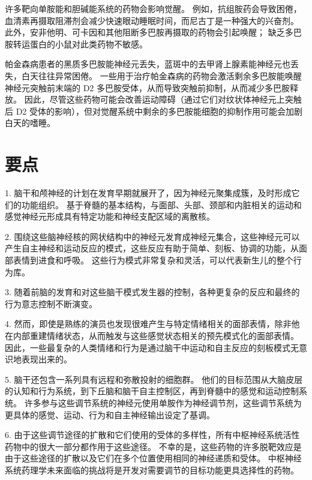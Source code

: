许多靶向单胺能和胆碱能系统的药物会影响觉醒。 例如，抗组胺药会导致困倦，血清素再摄取阻滞剂会减少快速眼动睡眠时间，而尼古丁是一种强大的兴奋剂。 此外，安非他明、可卡因和其他阻断多巴胺再摄取的药物会引起唤醒； 缺乏多巴胺转运蛋白的小鼠对此类药物不敏感。

帕金森病患者的黑质多巴胺能神经元丢失，蓝斑中的去甲肾上腺素能神经元也丢失，白天往往异常困倦。 一些用于治疗帕金森病的药物会激活剩余多巴胺能唤醒神经元突触前末端的 D2 多巴胺受体，从而导致突触前抑制，从而减少多巴胺释放。 因此，尽管这些药物可能会改善运动障碍（通过它们对纹状体神经元上突触后 D2 受体的影响），但对觉醒系统中剩余的多巴胺能细胞的抑制作用可能会加剧白天的嗜睡。

\section{要点}
1. 脑干和颅神经的计划在发育早期就展开了，因为神经元聚集成簇，及时形成它们的功能组织。 基于脊髓的基本结构，与面部、头部、颈部和内脏相关的运动和感觉神经元形成具有特定功能和神经支配区域的离散核。 

2. 围绕这些脑神经核的网状结构中的神经元发育成神经元集合，这些神经元可以产生自主神经和运动反应的模式，这些反应有助于简单、刻板、协调的功能，从面部表情到进食和呼吸。 这些行为模式非常复杂和灵活，可以代表新生儿的整个行为库。 

3. 随着前脑的发育和对这些脑干模式发生器的控制，各种更复杂的反应和最终的行为意志控制不断演变。 

4. 然而，即使是熟练的演员也发现很难产生与特定情绪相关的面部表情，除非他在内部重建情绪状态，从而触发与这些感觉状态相关的预先模式化的面部表情。 因此，一些最复杂的人类情绪和行为是通过脑干中运动和自主反应的刻板模式无意识地表现出来的。 

5. 脑干还包含一系列具有远程和弥散投射的细胞群。 他们的目标范围从大脑皮层的认知和行为系统，到下丘脑和脑干自主控制区，再到脊髓中的感觉和运动控制系统。 许多参与这些调节系统的神经元使用单胺作为神经调节剂，这些调节系统为更具体的感觉、运动、行为和自主神经输出设定了基调。 

6. 由于这些调节途径的扩散和它们使用的受体的多样性，所有中枢神经系统活性药物中的很大一部分都作用于这些途径。 不幸的是，这些药物的许多脱靶效应是由于这些途径的扩散以及它们在多个位置使用相同的神经递质和受体。 中枢神经系统药理学未来面临的挑战将是开发对需要调节的目标功能更具选择性的药物。

